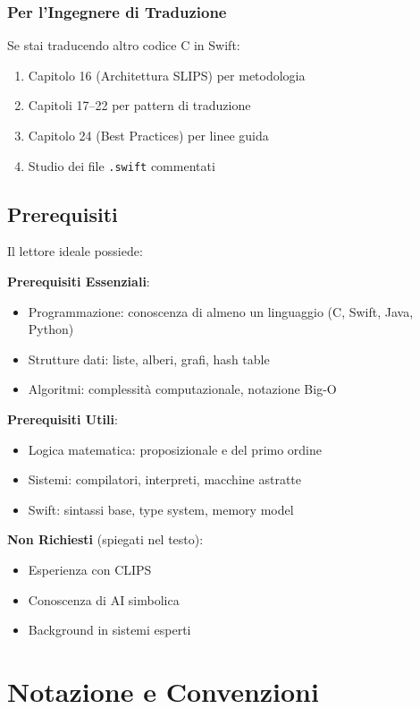 \subsubsection{Per l'Ingegnere di Traduzione}

Se stai traducendo altro codice C in Swift:
\begin{enumerate}
\item Capitolo 16 (Architettura SLIPS) per metodologia
\item Capitoli 17--22 per pattern di traduzione
\item Capitolo 24 (Best Practices) per linee guida
\item Studio dei file \texttt{.swift} commentati
\end{enumerate}

\subsection{Prerequisiti}

Il lettore ideale possiede:

\textbf{Prerequisiti Essenziali}:
\begin{itemize}
\item Programmazione: conoscenza di almeno un linguaggio (C, Swift, Java, Python)
\item Strutture dati: liste, alberi, grafi, hash table
\item Algoritmi: complessità computazionale, notazione Big-O
\end{itemize}

\textbf{Prerequisiti Utili}:
\begin{itemize}
\item Logica matematica: proposizionale e del primo ordine
\item Sistemi: compilatori, interpreti, macchine astratte
\item Swift: sintassi base, type system, memory model
\end{itemize}

\textbf{Non Richiesti} (spiegati nel testo):
\begin{itemize}
\item Esperienza con CLIPS
\item Conoscenza di AI simbolica
\item Background in sistemi esperti
\end{itemize}

\section{Notazione e Convenzioni}

